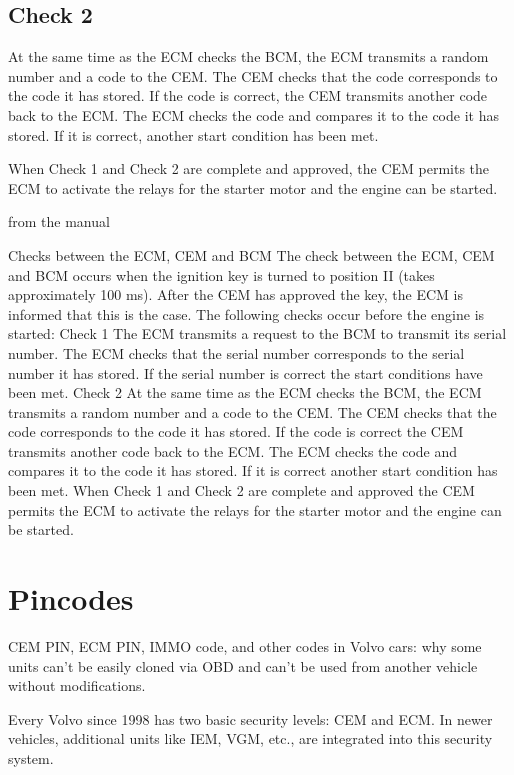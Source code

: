 \documentclass[letterpaper,10pt,english]{sphinxmanual}
\begin{document}
\subsection{Check 2}
\label{\detokenize{hacking/checks:check-2}}
\sphinxAtStartPar
At the same time as the ECM checks the BCM, the ECM transmits a random number and a code to the CEM. The CEM checks that the code corresponds to the code it has stored. If the code is correct, the CEM transmits another code back to the ECM. The ECM checks the code and compares it to the code it has stored. If it is correct, another start condition has been met.

\sphinxAtStartPar
When Check 1 and Check 2 are complete and approved, the CEM permits the ECM to activate the relays for the starter motor and the engine can be started.

\sphinxAtStartPar
from the manual

\sphinxAtStartPar
Checks between the ECM, CEM and BCM
The check between the ECM, CEM and BCM occurs when the ignition key is turned to position II (takes
approximately 100 ms).
After the CEM has approved the key, the ECM is informed that this is the case.
The following checks occur before the engine is started:
Check 1
The ECM transmits a request to the BCM to transmit its serial number. The ECM checks that the serial
number corresponds to the serial number it has stored. If the serial number is correct the start
conditions have been met.
Check 2
At the same time as the ECM checks the BCM, the ECM transmits a random number and a code to the
CEM. The CEM checks that the code corresponds to the code it has stored. If the code is correct the
CEM transmits another code back to the ECM. The ECM checks the code and compares it to the code
it has stored. If it is correct another start condition has been met.
When Check 1 and Check 2 are complete and approved the CEM permits the ECM to activate the
relays for the starter motor and the engine can be started.


\section{Pincodes}
\label{\detokenize{hacking/pincode:pincodes}}\label{\detokenize{hacking/pincode::doc}}
\sphinxAtStartPar
CEM PIN, ECM PIN, IMMO code, and other codes in Volvo cars: why some units can’t be easily cloned via OBD and can’t be used from another vehicle without modifications.

\sphinxAtStartPar
Every Volvo since 1998 has two basic security levels: CEM and ECM. In newer vehicles, additional units like IEM, VGM, etc., are integrated into this security system.
\end{document}
